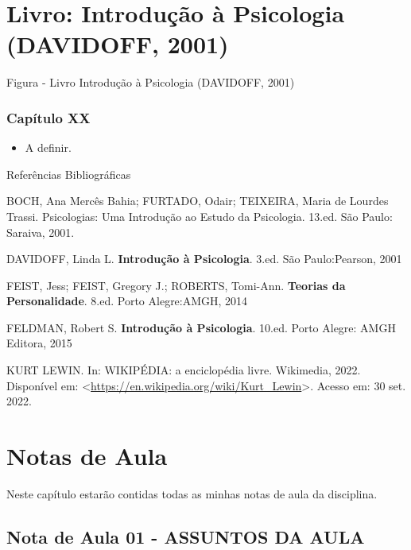 \documentclass[
]{book}
\providecommand{\tightlist}{%
  \setlength{\itemsep}{0pt}\setlength{\parskip}{0pt}}
\begin{document}
\hypertarget{livro-introduuxe7uxe3o-uxe0-psicologia-davidoff-2001}{%
\chapter{\texorpdfstring{Livro: \textbf{Introdução à Psicologia} (DAVIDOFF, 2001)}{Livro: Introdução à Psicologia (DAVIDOFF, 2001)}}\label{livro-introduuxe7uxe3o-uxe0-psicologia-davidoff-2001}}

Figura - Livro Introdução à Psicologia (DAVIDOFF, 2001)

\hypertarget{capuxedtulo-xx}{%
\subsection{Capítulo XX}\label{capuxedtulo-xx}}

\begin{itemize}
\tightlist
\item
  A definir.
\end{itemize}

Referências Bibliográficas

BOCH, Ana Mercês Bahia; FURTADO, Odair; TEIXEIRA, Maria de Lourdes Trassi. Psicologias: Uma Introdução ao Estudo da Psicologia. 13.ed. São Paulo: Saraiva, 2001.

DAVIDOFF, Linda L. \textbf{Introdução à Psicologia}. 3.ed. São Paulo:Pearson, 2001

FEIST, Jess; FEIST, Gregory J.; ROBERTS, Tomi-Ann. \textbf{Teorias da Personalidade}. 8.ed. Porto Alegre:AMGH, 2014

FELDMAN, Robert S. \textbf{Introdução à Psicologia}. 10.ed. Porto Alegre: AMGH Editora, 2015

KURT LEWIN. In: WIKIPÉDIA: a enciclopédia livre. Wikimedia, 2022. Disponível em: \textless{}\url{https://en.wikipedia.org/wiki/Kurt_Lewin}\textgreater. Acesso em: 30 set. 2022.

\hypertarget{notas-de-aula}{%
\chapter{Notas de Aula}\label{notas-de-aula}}

Neste capítulo estarão contidas todas as minhas notas de aula da disciplina.

\hypertarget{nota-de-aula-01---assuntos-da-aula}{%
\section{Nota de Aula 01 - ASSUNTOS DA AULA}\label{nota-de-aula-01---assuntos-da-aula}}
\end{document}

